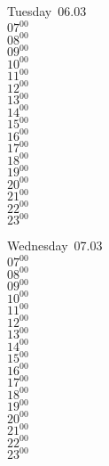 \documentclass[11pt, a4paper]{book}\usepackage[]{graphicx}\usepackage[]{color}
\begin{document}
\begin{weekdaybox}
  Tuesday~06.03\\
  { 
  \vfill
  $07^{00}$\\
$08^{00}$\\
$09^{00}$\\
$10^{00}$\\
$11^{00}$\\
$12^{00}$\\
$13^{00}$\\
$14^{00}$\\
$15^{00}$\\
$16^{00}$\\
$17^{00}$\\
$18^{00}$\\
$19^{00}$\\
$20^{00}$\\
$21^{00}$\\
$22^{00}$\\
$23^{00}$\\
  }
\end{weekdaybox}
\begin{weekdaybox}
  Wednesday~07.03\\
  { 
  \vfill
  $07^{00}$\\
$08^{00}$\\
$09^{00}$\\
$10^{00}$\\
$11^{00}$\\
$12^{00}$\\
$13^{00}$\\
$14^{00}$\\
$15^{00}$\\
$16^{00}$\\
$17^{00}$\\
$18^{00}$\\
$19^{00}$\\
$20^{00}$\\
$21^{00}$\\
$22^{00}$\\
$23^{00}$\\
  }
\end{weekdaybox}
\clearpage
\begin{headerbox}
\end{headerbox}
\end{document}

